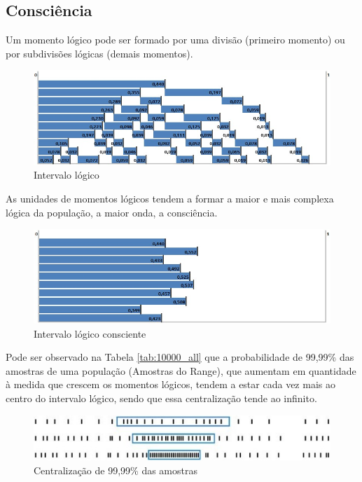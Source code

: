 \subsection{Consciência}
Um momento lógico pode ser formado por uma divisão (primeiro momento) ou por subdivisões lógicas (demais momentos).
	\begin{figure}[H]
	\caption{Intervalo lógico}
	\label{fig:consciousness_logical_moments}
	\centering
	\includegraphics[scale=.7]{sections/images/consciousness_logical_moments.jpg}
	\end{figure}

As unidades de momentos lógicos tendem a formar a maior e mais complexa lógica da população, a maior onda, a consciência.
	\begin{figure}[H]
	\caption{Intervalo lógico consciente}
	\label{fig:consciousness}
	\centering
	\includegraphics[scale=.7]{sections/images/consciousness.jpg}
	\end{figure}

Pode ser observado na Tabela \ref{tab:10000_all} que a probabilidade de 99,99\% das amostras de uma população (Amostras do Range), que aumentam em quantidade à medida que crescem os momentos lógicos, tendem a estar cada vez mais ao centro do intervalo lógico, sendo que essa centralização tende ao infinito.
	\begin{figure}[H]
	\caption{Centralização de 99,99\% das amostras}
	\label{fig:centering_of_99_range}
	\centering
	\includegraphics[scale=1]{sections/images/centering_of_99_range.jpg}
	\end{figure}

